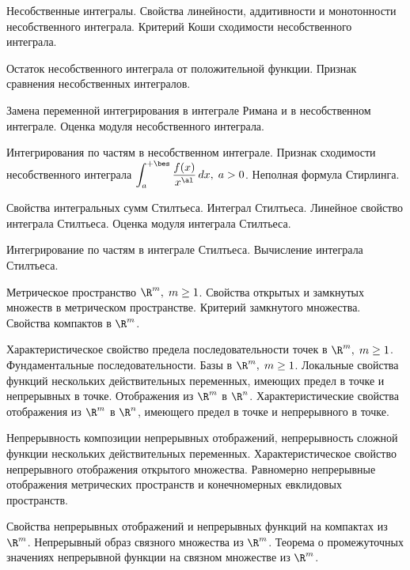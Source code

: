 \documentclass[a4paper]{article}
\begin{document}
\begin{nums}{-1}
\item Несобственные интегралы. Свойства линейности, аддитивности и
монотонности несобственного интеграла. Критерий Коши сходимости
несобственного интеграла.

\item Остаток несобственного интеграла от положительной функции.
Признак сравнения несобственных интегралов.

\item Замена переменной интегрирования в интеграле Римана и в
несобственном интеграле. Оценка модуля несобственного интеграла.

\item Интегрирования по частям в несобственном интеграле. Признак
сходимости несобственного интеграла $\displaystyle{\int_a^{+\bes}
\frac{f(x)}{x^{\al}}\,dx, \; a>0}$. Неполная формула Стирлинга.

\item Свойства интегральных сумм Стилтьеса. Интеграл Стилтьеса.
Линейное свойство интеграла Стилтьеса. Оценка модуля интеграла
Стилтьеса.

\item Интегрирование по частям в интеграле Стилтьеса. Вычисление
интеграла Стилтьеса.

\item Метрическое пространство $\R^m, \; m\ge1$. Свойства открытых и
замкнутых множеств в метрическом пространстве. Критерий замкнутого
множества. Свойства компактов в $\R^m$.

\item Характеристическое свойство предела последовательности точек в
$\R^m,\;m\ge1$. Фундаментальные последовательности. Базы в $\R^m, \;
m\ge1$. Локальные свойства функций нескольких действительных
переменных, имеющих предел в точке и непрерывных в точке.
Отображения из $\R^m$ в $\R^n$. Характеристические свойства
отображения из $\R^m$ в $\R^n$, имеющего предел в точке и
непрерывного в точке.

\item Непрерывность композиции непрерывных отображений,
непрерывность сложной функции нескольких действительных переменных.
Характеристическое свойство непрерывного отображения открытого
множества. Равномерно непрерывные отображения метрических
пространств и конечномерных евклидовых пространств.

\item Свойства непрерывных отображений и непрерывных функций на
компактах из $\R^m$. Непрерывный образ связного множества из $\R^m$.
Теорема о промежуточных значениях непрерывной функции на связном
множестве из $\R^m$.


\end{nums}
\end{document}

